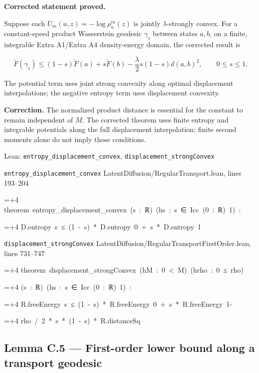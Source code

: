 \documentclass[11pt,a4paper]{report}
\newlength{\leancharwidth}
\newenvironment{leancode}{\par\smallskip\begingroup\ttfamily\footnotesize\raggedright
  \settowidth{\leancharwidth}{M}\setlength{\parskip}{0pt}\setlength{\parindent}{0pt}
  \frenchspacing}{\par\endgroup\smallskip}
\newcommand{\leanline}[2]{\hangindent=\dimexpr#1\leancharwidth+4\leancharwidth\relax
  \hangafter=1\noindent\hspace*{#1\leancharwidth}#2\par}
\newcommand{\leansource}[1]{\par{\footnotesize\color{leanmuted}#1}\par}
\begin{document}
\textbf{Corrected statement proved.}



Suppose each
        \(U_m(u,z)=-\log\rho_u^m(z)\) is jointly
        \(\lambda\)-strongly convex. For a constant-speed product
        Wasserstein geodesic \(\gamma_s\) between states \(a,b\), on a
        finite, integrable Extra A1/\allowbreak{}Extra A4 density-energy domain, the corrected result is


        \[\widetilde F(\gamma_s)\le(1-s)\widetilde F(a)
          +s\widetilde F(b)-\frac\lambda2s(1-s)d(a,b)^2,
          \qquad 0\le s\le1.\]


The potential term uses joint strong convexity along optimal
        displacement interpolations; the negative entropy term uses
        displacement convexity.



\textbf{Correction.} The normalized product distance is essential for the constant to remain independent of \(M\). The corrected theorem uses finite entropy and integrable potentials along the full displacement interpolation; finite second moments alone do not imply those conditions.

\begin{leanbox}{Lean: \texttt{entropy\_\allowbreak{}displacement\_\allowbreak{}convex}, \texttt{displacement\_\allowbreak{}strongConvex}}
\leansource{\texttt{entropy\_\allowbreak{}displacement\_\allowbreak{}convex} \quad LatentDiffusion/\allowbreak{}RegularTransport.lean, lines 193–204}
\begin{leancode}
\leanline{0}{theorem\ entropy\_displacement\_convex\ (s\ :\ ℝ)\ (hs\ :\ s\ ∈\ Icc\ (0\ :\ ℝ)\ 1)\ :}
\leanline{4}{D.entropy\ s\ ≤\ (1\ -\ s)\ *\ D.entropy\ 0\ +\ s\ *\ D.entropy\ 1}
\end{leancode}
\leansource{\texttt{displacement\_\allowbreak{}strongConvex} \quad LatentDiffusion/\allowbreak{}RegularTransportFirstOrder.lean, lines 731–747}
\begin{leancode}
\leanline{0}{theorem\ displacement\_strongConvex\ (hM\ :\ 0\ <\ M)\ (hrho\ :\ 0\ ≤\ rho)}
\leanline{4}{(s\ :\ ℝ)\ (hs\ :\ s\ ∈\ Icc\ (0\ :\ ℝ)\ 1)\ :}
\leanline{4}{R.freeEnergy\ s\ ≤\ (1\ -\ s)\ *\ R.freeEnergy\ 0\ +\ s\ *\ R.freeEnergy\ 1-}
\leanline{6}{rho\ /\ 2\ *\ s\ *\ (1\ -\ s)\ *\ R.distanceSq}
\end{leancode}
\end{leanbox}
\subsection{\texorpdfstring{Lemma C.5 — First-order lower bound along a transport geodesic}{Lemma C.5 — First-order lower bound along a transport geodesic}}
\end{document}
